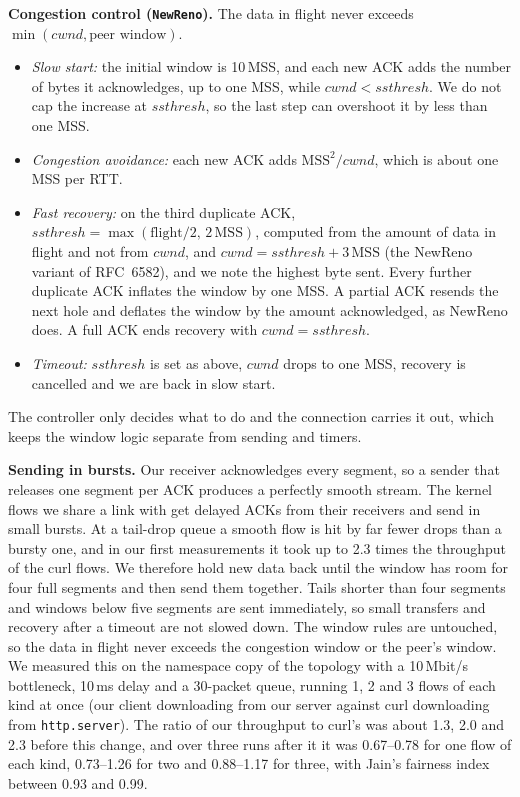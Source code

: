 \documentclass[10pt,a4paper]{article}
\newcommand{\cmd}[1]{\texttt{#1}}
\begin{document}
\textbf{Congestion control (\cmd{NewReno}).}
The data in flight never exceeds $\min(\mathit{cwnd},\text{peer window})$.
\begin{itemize}
\item \emph{Slow start:} the initial window is 10\,MSS, and each new ACK adds the number of bytes it
  acknowledges, up to one MSS, while $\mathit{cwnd}<\mathit{ssthresh}$. We do not cap the increase at
  $\mathit{ssthresh}$, so the last step can overshoot it by less than one MSS.
\item \emph{Congestion avoidance:} each new ACK adds $\mathrm{MSS}^2/\mathit{cwnd}$, which is about one MSS per RTT.
\item \emph{Fast recovery:} on the third duplicate ACK, $\mathit{ssthresh}=\max(\text{flight}/2,\,2\,\mathrm{MSS})$,
  computed from the amount of data in flight and not from $\mathit{cwnd}$, and
  $\mathit{cwnd}=\mathit{ssthresh}+3\,\mathrm{MSS}$ (the NewReno variant of RFC~6582), and we note the highest byte sent. Every further duplicate ACK
  inflates the window by one MSS. A partial ACK resends the next hole and deflates the window by the
  amount acknowledged, as NewReno does. A full ACK ends recovery with $\mathit{cwnd}=\mathit{ssthresh}$.
\item \emph{Timeout:} $\mathit{ssthresh}$ is set as above, $\mathit{cwnd}$ drops to one MSS, recovery is
  cancelled and we are back in slow start.
\end{itemize}
The controller only decides what to do and the connection carries it out, which keeps the
window logic separate from sending and timers.

\textbf{Sending in bursts.} Our receiver acknowledges every segment, so a sender that releases one segment per
ACK produces a perfectly smooth stream. The kernel flows we share a link with get delayed ACKs from their
receivers and send in small bursts. At a tail-drop queue a smooth flow is hit by far fewer drops than a bursty one,
and in our first measurements it took up to 2.3 times the throughput of the curl flows. We therefore hold new data back until
the window has room for four full segments and then send them together. Tails shorter than four segments
and windows below five segments are sent immediately, so small transfers and recovery after a timeout are not slowed down.
The window rules are untouched, so the data in flight never exceeds the congestion window or the peer's window.
We measured this on the namespace copy of the topology with a 10\,Mbit/s bottleneck, 10\,ms delay and a 30-packet queue,
running 1, 2 and 3 flows of each kind at once (our client downloading from our server against curl downloading from
\cmd{http.server}). The ratio of our throughput to curl's was about 1.3, 2.0 and 2.3 before this change, and over
three runs after it it was 0.67--0.78 for one flow of each kind, 0.73--1.26 for two and 0.88--1.17 for three,
with Jain's fairness index between 0.93 and 0.99.
\end{document}
